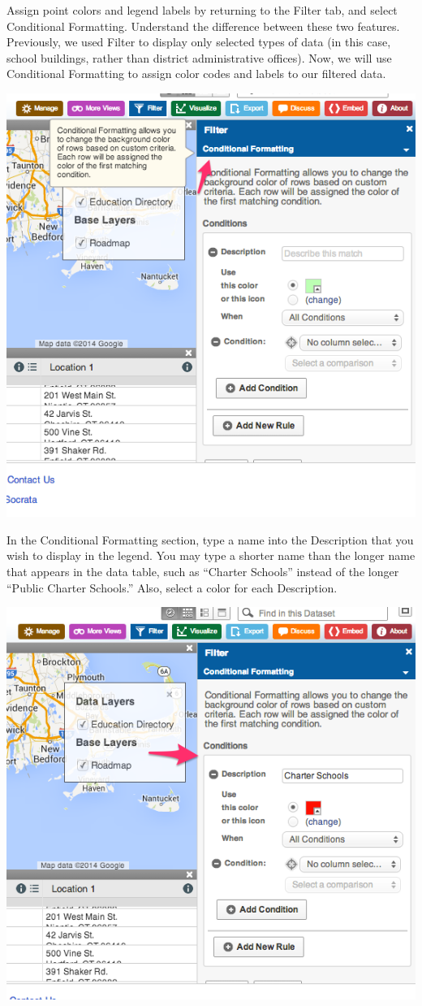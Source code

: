 \documentclass[
  english,
]{book}
\begin{document}
Assign point colors and legend labels by returning to the Filter tab, and select Conditional Formatting. Understand the difference between these two features. Previously, we used Filter to display only selected types of data (in this case, school buildings, rather than district administrative offices). Now, we will use Conditional Formatting to assign color codes and labels to our filtered data.

\includegraphics{images/06-map/SocrataMap9.png}

In the Conditional Formatting section, type a name into the Description that you wish to display in the legend. You may type a shorter name than the longer name that appears in the data table, such as ``Charter Schools'' instead of the longer ``Public Charter Schools.'' Also, select a color for each Description.

\includegraphics{images/06-map/SocrataMap10.png}
\end{document}
